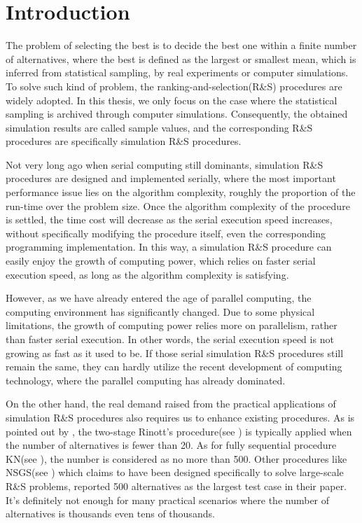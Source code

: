 \chapter{Introduction}

The problem of selecting the best is to decide the best one within a finite number of alternatives, where the best is defined as the largest or smallest mean, which is inferred from statistical sampling, by real experiments or computer simulations. To solve such kind of problem, the ranking-and-selection(R\&S) procedures are widely adopted. In this thesis, we only focus on the case where the statistical sampling is archived through computer simulations. Consequently, the obtained simulation results are called sample values, and the corresponding R\&S procedures are specifically simulation R\&S procedures.

Not very long ago when serial computing still dominants, simulation R\&S procedures are designed and implemented serially, where the most important performance issue lies on the algorithm complexity, roughly the proportion of the run-time over the problem size. Once the algorithm complexity of the procedure is settled, the time cost will decrease as the serial execution speed increases, without specifically modifying the procedure itself, even the corresponding programming implementation. In this way, a simulation R\&S procedure can easily enjoy the growth of computing power, which relies on faster serial execution speed, as long as the algorithm complexity is satisfying.

However, as we have already entered the age of parallel computing, the computing environment has significantly changed. Due to some physical limitations, the growth of computing power relies more on parallelism, rather than faster serial execution. In other words, the serial execution speed is not growing as fast as it used to be. If those serial simulation R\&S procedures still remain the same, they can hardly utilize the recent development of computing technology, where the parallel computing has already dominated.

On the other hand, the real demand raised from the practical applications of simulation R\&S procedures also requires us to enhance existing procedures. As is pointed out by \cite{ehiorams06ras}, the two-stage Rinott’s procedure(see \cite{cistam1978rinott}) is typically applied when the number of alternatives is fewer than 20. As for fully sequential procedure KN(see \cite{tomacs01kn}), the number is considered as no more than 500. Other procedures like NSGS(see \cite{or01nsgs}) which claims to have been designed specifically to solve large-scale R\&S problems, reported 500 alternatives as the largest test case in their paper. It's definitely not enough for many practical scenarios where the number of alternatives is thousands even tens of thousands.

